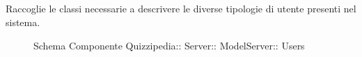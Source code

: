 \subsection{}
Raccoglie le classi necessarie a descrivere le diverse tipologie di utente presenti nel sistema.
\begin{figure}[H]
\centering
\noindent{}
\caption[Schema Componente Users]{Schema Componente Quizzipedia:: Server:: ModelServer:: Users}
\end{figure}
